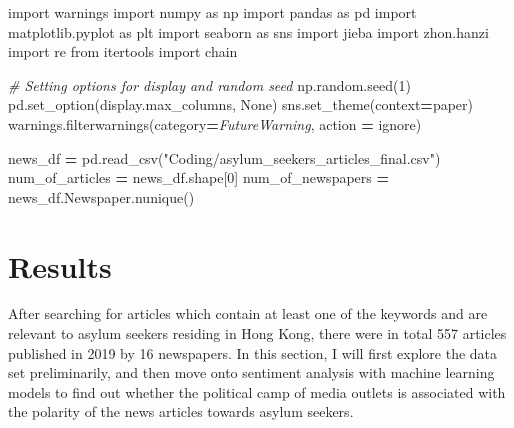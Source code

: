 \documentclass[a4paper, oneside]{report}
\newenvironment{Shaded}{\begin{snugshade}}{\end{snugshade}}
\newcommand{\CommentTok}[1]{\textcolor[rgb]{0.56,0.35,0.01}{\textit{#1}}}
\newcommand{\DecValTok}[1]{\textcolor[rgb]{0.00,0.00,0.81}{#1}}
\newcommand{\ImportTok}[1]{#1}
\newcommand{\NormalTok}[1]{#1}
\newcommand{\OperatorTok}[1]{\textcolor[rgb]{0.81,0.36,0.00}{\textbf{#1}}}
\newcommand{\PreprocessorTok}[1]{\textcolor[rgb]{0.56,0.35,0.01}{\textit{#1}}}
\newcommand{\StringTok}[1]{\textcolor[rgb]{0.31,0.60,0.02}{#1}}
\newcommand{\VariableTok}[1]{\textcolor[rgb]{0.00,0.00,0.00}{#1}}
\renewenvironment{Shaded}
{
  \vspace{4pt}%
  \begin{snugshade}%
}{%
  \end{snugshade}%
  \vspace{4pt}%
}
\begin{document}
\begin{Shaded}
\begin{Highlighting}[]
\ImportTok{import}\NormalTok{ warnings}
\ImportTok{import}\NormalTok{ numpy }\ImportTok{as}\NormalTok{ np}
\ImportTok{import}\NormalTok{ pandas }\ImportTok{as}\NormalTok{ pd}
\ImportTok{import}\NormalTok{ matplotlib.pyplot }\ImportTok{as}\NormalTok{ plt}
\ImportTok{import}\NormalTok{ seaborn }\ImportTok{as}\NormalTok{ sns}
\ImportTok{import}\NormalTok{ jieba}
\ImportTok{import}\NormalTok{ zhon.hanzi}
\ImportTok{import}\NormalTok{ re}
\ImportTok{from}\NormalTok{ itertools }\ImportTok{import}\NormalTok{ chain}

\CommentTok{\# Setting options for display and random seed}
\NormalTok{np.random.seed(}\DecValTok{1}\NormalTok{)}
\NormalTok{pd.set\_option(}\StringTok{\textquotesingle{}display.max\_columns\textquotesingle{}}\NormalTok{, }\VariableTok{None}\NormalTok{)}
\NormalTok{sns.set\_theme(context}\OperatorTok{=}\StringTok{\textquotesingle{}paper\textquotesingle{}}\NormalTok{)}
\NormalTok{warnings.filterwarnings(category}\OperatorTok{=}\PreprocessorTok{FutureWarning}\NormalTok{, action }\OperatorTok{=} \StringTok{\textquotesingle{}ignore\textquotesingle{}}\NormalTok{)}
\end{Highlighting}
\end{Shaded}

\begin{Shaded}
\begin{Highlighting}[]
\NormalTok{news\_df }\OperatorTok{=}\NormalTok{ pd.read\_csv(}\StringTok{"Coding/asylum\_seekers\_articles\_final.csv"}\NormalTok{)}
\NormalTok{num\_of\_articles }\OperatorTok{=}\NormalTok{ news\_df.shape[}\DecValTok{0}\NormalTok{]}
\NormalTok{num\_of\_newspapers }\OperatorTok{=}\NormalTok{ news\_df.Newspaper.nunique()}
\end{Highlighting}
\end{Shaded}

\hypertarget{results}{%
\chapter{Results}\label{results}}

After searching for articles which contain at least one of the keywords
and are relevant to asylum seekers residing in Hong Kong, there were in
total 557 articles published in 2019 by 16 newspapers. In this section,
I will first explore the data set preliminarily, and then move onto
sentiment analysis with machine learning models to find out whether the
political camp of media outlets is associated with the polarity of the
news articles towards asylum seekers.
\end{document}
